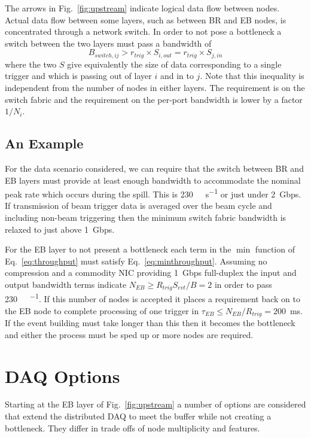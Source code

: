 \documentclass[pdftex,12pt,letter]{article}
\begin{document}
The arrows in Fig.~\ref{fig:upstream} indicate logical data flow
between nodes.  Actual data flow between some layers, such as between
BR and EB nodes, is concentrated through a network switch.  In order
to not pose a bottleneck a switch between the two layers must pass a
bandwidth of
\begin{equation}
  \label{eq:switchbw}
  B_{switch,ij} > r_{trig} \times S_{i,out} =r_{trig} \times S_{j,in}
\end{equation}
where the two $S$ give equivalently the size of data corresponding to
a single trigger and which is passing out of layer $i$ and in to $j$.
Note that this inequality is independent from the number of nodes in
either layers.  The requirement is on the switch fabric and the
requirement on the per-port bandwidth is lower by a factor
$1/N_i$.



\subsection{An Example}

For the data scenario considered, we can require that 
the switch between BR and EB layers must provide at least
enough bandwidth to accommodate the nominal peak rate which occurs
during the spill.  This is \SI{230}{\mega\byte\per\second}
or just under 2~Gbps.  If transmission of beam trigger data is
averaged over the beam cycle and including non-beam triggering then
the minimum switch fabric bandwidth is relaxed to just above 1~Gbps.

For the EB layer to not present a bottleneck each term in the $\min$
function of Eq.~\ref{eq:throughput} must satisfy
Eq.~\ref{eq:minthroughput}.  Assuming no compression and a commodity
NIC providing 1~Gbps full-duplex the input and output bandwidth terms
indicate $N_{EB} \geq R_{trig}S_{evt}/B = 2$ in order to pass
\SI{230}{\mega\byte\per\sec}.  If this number of nodes is accepted it
places a requirement back on to the EB node to complete processing of
one trigger in
$\tau_{EB} \leq N_{EB}/R_{trig} = 200$~\si{\milli\second}.  If the
event building must take longer than this then it becomes the
bottleneck and either the process must be sped up or more nodes are
required.

\section{DAQ Options}

Starting at the EB layer of Fig.~\ref{fig:upstream} a number of
options are considered that extend the distributed DAQ to meet the
buffer while not creating a bottleneck.  They differ in trade offs of
node multiplicity and features.
\end{document}
